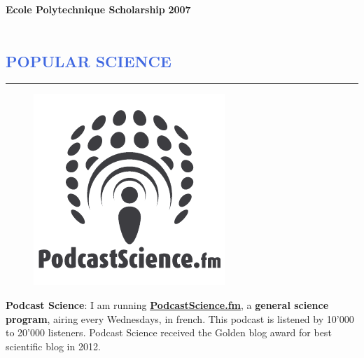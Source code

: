 \documentclass[12pt]{article}
\begin{document}
\vspace{-0.1cm}
\textbf{Ecole Polytechnique Scholarship}   \hfill   \textbf{2007}\\


\newpage
\textcolor{White}{.}
\vspace{-1.5cm}
\textcolor{RoyalBlue}{\section{\large POPULAR SCIENCE}
\vspace{-0.35cm}\hrule}
\vspace{0.6cm}
\begin{figure}
\vspace{-0.95cm}
\begin{mybox}
    \includegraphics[width=1.\textwidth]{figures_CV/PodcastScience.png}
 \end{mybox}
\vspace{-1.1cm}
\end{figure}
\textbf{Podcast Science}: I am running \href{http://www.podcastscience.fm}{\textbf{PodcastScience.fm}}, a \textbf{general science program}, airing every Wednesdays, in french. This podcast is listened by 10'000 to 20'000 listeners. Podcast Science received the Golden blog award for best scientific blog in 2012.
\end{document}
